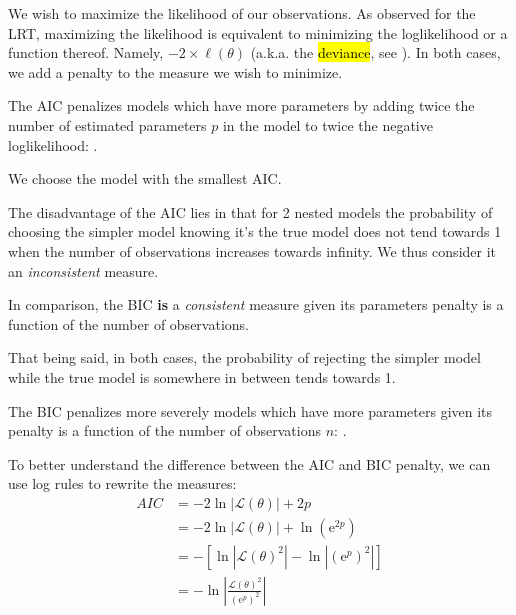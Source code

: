 \documentclass[english]{article}
\begin{document}
\begin{multicols*}{2}
\begin{rappel_enhanced}[Context]
\bigskip

We wish to maximize the likelihood of our observations. As observed for the LRT, maximizing the likelihood is equivalent to minimizing the loglikelihood or a function thereof. Namely, $-2 \times \ell(\theta)$ (a.k.a. the \hl{deviance}, see \textit{\underline{}}). In both cases, we add a penalty to the measure we wish to minimize.
\end{rappel_enhanced}

\begin{definitionNOHFILLsub}
The AIC penalizes models which have more parameters by adding twice the number of estimated parameters $p$ in the model to twice the negative loglikelihood: . 

\bigskip

We choose the model with the smallest AIC.
\end{definitionNOHFILLsub}

\begin{rappel_enhanced}[Context]
The disadvantage of the AIC lies in that for 2 nested models the probability of choosing the simpler model knowing it's the true model does not tend towards 1 when the number of observations increases towards infinity. We thus consider it an \textit{inconsistent} measure.

\bigskip

In comparison, the BIC \textbf{is} a \textit{consistent} measure given its parameters penalty is a function of the number of observations.

\bigskip

That being said, in both cases, the probability of rejecting the simpler model while the true model is somewhere in between tends towards 1.
\end{rappel_enhanced}


\begin{definitionNOHFILLsub}
The BIC penalizes more severely models which have more parameters given its penalty is a function of the number of observations $n$: .
\end{definitionNOHFILLsub}

\bigskip

To better understand the difference between the AIC and BIC penalty, we can use log rules to rewrite the measures:
\begin{align*}
	AIC	
	&=	-2\ln|\mathcal{L}(\theta)| + 2p	\\
	&=	-2\ln|\mathcal{L}(\theta)| + \ln\left(\textrm{e}^{2p}\right)	\\
	&=	-\left[\ln|\mathcal{L}(\theta)^{2}| - \ln\left|\left(\textrm{e}^{p}\right)^{2}\right|\right]	\\
	&=	-\ln\left|\frac{\mathcal{L}(\theta)^{2}}{\left(\textrm{e}^{p}\right)^{2}}\right|	
\end{align*}


\end{multicols*}
\end{document}
